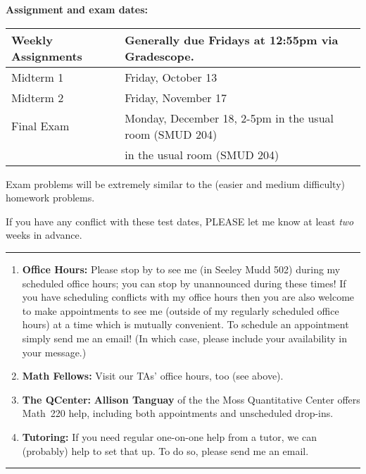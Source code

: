 \documentclass[12pt]{article}
\begin{document}
\noindent\textbf{Assignment and exam dates:}

\begin{center}
 \begin{tabular}{|l|l|}
 \hline
 Weekly Assignments & Generally due Fridays at 12:55pm via Gradescope.\\
 \hline
 Midterm 1 & Friday, October 13 \\
 Midterm 2 & Friday, November 17 \\ 
   Final Exam & Monday, December 18, 2-5pm in the usual room (SMUD 204)	 \\
 & in the usual room (SMUD 204)	 \\   
 \hline
 \end{tabular}
\end{center}

\noindent Exam problems will be extremely similar to the (easier and medium difficulty) homework problems.
\smallskip

\noindent If you have any conflict with these test dates, PLEASE let me know at least \emph{two} weeks in advance.

\medskip \hrule \medskip



\begin{enumerate}
\item[]{\bf Office Hours:} Please stop by to see me (in Seeley Mudd 502) during my scheduled office hours; you can stop by unannounced during these times! If you have scheduling conflicts with my office hours then you are also welcome to make appointments to see me (outside of my regularly scheduled office hours) at a time which is mutually convenient. To schedule an appointment simply send me an email! (In which case, please include your availability in your message.)
\item[] {\bf Math Fellows:} Visit our TAs' office hours, too (see above).
\item[] {\bf The QCenter:} \textbf{Allison Tanguay} of the the Moss Quantitative Center offers Math~220 help, including both appointments and unscheduled drop-ins.
\item[] {\bf Tutoring:} If you need regular one-on-one help from a tutor, we can (probably) help to set that up. To do so, please send me an email.
\end{enumerate}

\smallskip \hrule \medskip
\end{document}
